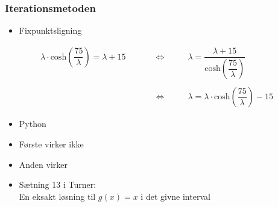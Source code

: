 \begin{frame}
\frametitle{Iterationsmetoden}
\center
%
\begin{itemize}
\item Fixpunktsligning
\end{itemize}
%
\begin{align*}
\lambda \cdot \text{cosh} \left( \dfrac{75}{\lambda} \right) =\lambda+15 
\phantom{HHH} & \Leftrightarrow \phantom{HHH}
\lambda=\dfrac{\lambda+15}{\text{cosh} \left( \dfrac{75}{\lambda} \right) } \\
\\
 \phantom{HHH} & \Leftrightarrow \phantom{HHH}
\lambda = \lambda \cdot \text{cosh} \left( \dfrac{75}{\lambda} \right)-15  
\end{align*}
\begin{itemize}
\item Python
\item Første virker ikke 
\item Anden virker
\item Sætning 13 i Turner: \\ En eksakt løsning til $g(x)=x$ i det givne interval
\end{itemize}
\end{frame}